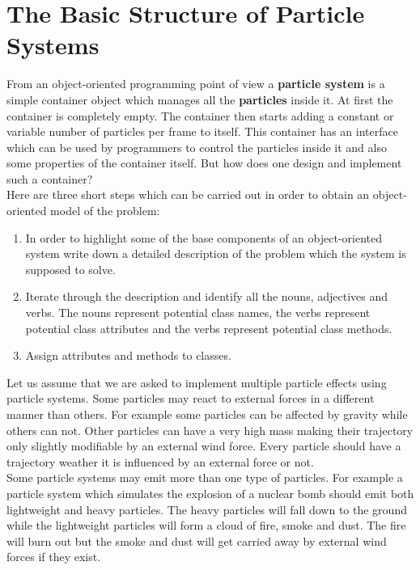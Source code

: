 \section{The Basic Structure of Particle Systems}
From an object-oriented programming point of view a \textbf{particle system} is a simple container object which manages all the \textbf{particles} inside it. At first the container is completely empty. The container then starts adding a constant or variable number of particles per frame to itself. This container has an interface which can be used by programmers to control the particles inside it and also some properties of the container itself. But how does one design and implement such a container?\\

Here are three short steps which can be carried out in order to obtain an object-oriented model of the problem:
\begin{enumerate}
	\item In order to highlight some of the base components of an object-oriented system write down a detailed description of the problem which the system is supposed to solve.
	
	\item Iterate through the description and identify all the nouns, adjectives and verbs. The nouns represent potential class names, the verbs represent potential class attributes and the verbs represent potential class methods.
	
	\item Assign attributes and methods to classes.
\end{enumerate}

\newpage

Let us assume that we are asked to implement multiple particle effects using particle systems. Some particles may react to external forces in a different manner than others. For example some particles can be affected by gravity while others can not. Other particles can have a very high mass making their trajectory only slightly modifiable by an external wind force. Every particle should have a trajectory weather it is influenced by an external force or not.\\

Some particle systems may emit more than one type of particles. For example a particle system which simulates the explosion of a nuclear bomb should emit both lightweight and heavy particles. The heavy particles will fall down to the ground while the lightweight particles will form a cloud of fire, smoke and dust. The fire will burn out but the smoke and dust will get carried away by external wind forces if they exist.\\

